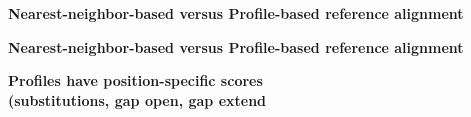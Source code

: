 \documentclass[landscape]{slides}
\begin{document}
\begin{slide}
\begin{center}
\textbf{Nearest-neighbor-based versus Profile-based reference alignment}
\end{center}


\vfill
\end{slide}
\begin{slide}
\begin{center}
\textbf{Nearest-neighbor-based versus Profile-based reference alignment}
\end{center}


\vfill
\end{slide}
\begin{slide}
\begin{center}
\textbf{Profiles have position-specific scores \\ (substitutions, gap
    open, gap extend}
\end{center}


\vfill
\end{slide}
\end{document}
